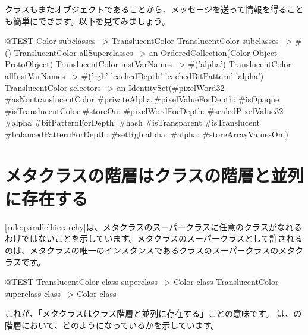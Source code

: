 \documentclass[a4paper,10pt,twoside]{book}
\begin{document}
クラスもまたオブジェクトであることから、メッセージを送って情報を得ることも簡単にできます。以下を見てみましょう。

\begin{code}{@TEST}
Color subclasses                           --> {TranslucentColor}
TranslucentColor subclasses         --> #()
TranslucentColor allSuperclasses  --> an OrderedCollection(Color Object ProtoObject)
TranslucentColor instVarNames     --> #('alpha')
TranslucentColor allInstVarNames --> #('rgb' 'cachedDepth' 'cachedBitPattern' 'alpha')
TranslucentColor selectors             -->  an IdentitySet(#pixelWord32 #asNontranslucentColor #privateAlpha #pixelValueForDepth: #isOpaque #isTranslucentColor #storeOn: #pixelWordForDepth: #scaledPixelValue32 #alpha #bitPatternForDepth: #hash #isTransparent #isTranslucent #balancedPatternForDepth: #setRgb:alpha: #alpha: #storeArrayValuesOn:)
\end{code}

\section{メタクラスの階層はクラスの階層と並列に存在する}

\ref{rule:parallelhierarchy}は、メタクラスのスーパークラスに任意のクラスがなれるわけではないことを示しています。メタクラスのスーパークラスとして許されるのは、メタクラスの唯一のインスタンスであるクラスのスーパークラスのメタクラスです。

\begin{code}{@TEST}
TranslucentColor class superclass --> Color class
TranslucentColor superclass class --> Color class
\end{code}

\noindent
これが、「メタクラスはクラス階層と並列に存在する」ことの意味です。 は、の階層において、どのようになっているかを示しています。
\end{document}
